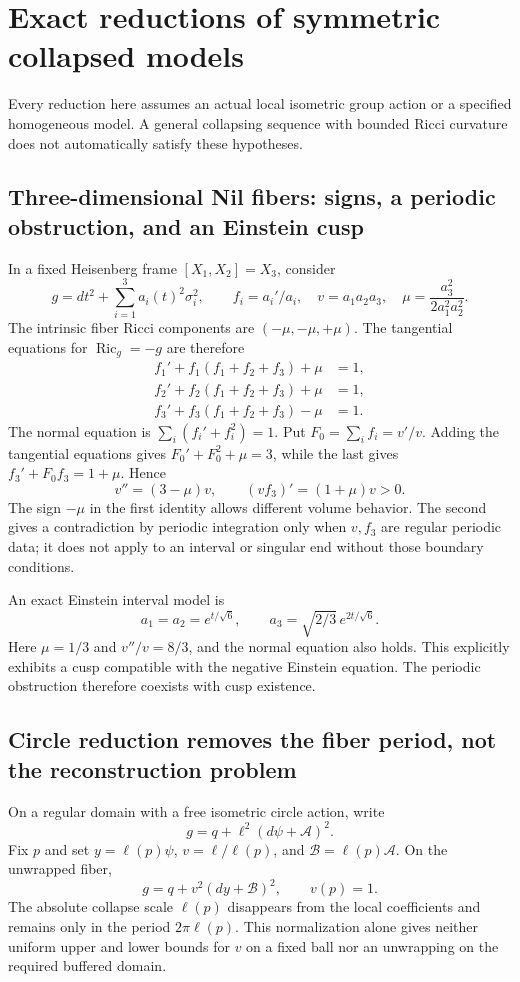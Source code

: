 \documentclass[a4paper,11pt]{article}
\numberwithin{equation}{section}
\theoremstyle{definition}
\newcommand{\Ric}{\operatorname{Ric}}
\begin{document}
\section{Exact reductions of symmetric collapsed models}\label{app:reduction}
Every reduction here assumes an actual local isometric group action or a specified homogeneous model. A general collapsing sequence with bounded Ricci curvature does not automatically satisfy these hypotheses.

\subsection{Three-dimensional Nil fibers: signs, a periodic obstruction, and an Einstein cusp}
In a fixed Heisenberg frame $[X_1,X_2]=X_3$, consider
\[
g=dt^2+\sum_{i=1}^3 a_i(t)^2\sigma_i^2,\qquad
f_i=a_i'/a_i,\quad v=a_1a_2a_3,\quad
\mu=\frac{a_3^2}{2a_1^2a_2^2}.
\]
The intrinsic fiber Ricci components are $(-\mu,-\mu,+\mu)$. The tangential equations for $\Ric_g=-g$ are therefore
\begin{align*}
f_1'+f_1(f_1+f_2+f_3)+\mu&=1,\\
f_2'+f_2(f_1+f_2+f_3)+\mu&=1,\\
f_3'+f_3(f_1+f_2+f_3)-\mu&=1.
\end{align*}
The normal equation is $\sum_i(f_i'+f_i^2)=1$. Put $F_0=\sum_i f_i=v'/v$. Adding the tangential equations gives $F_0'+F_0^2+\mu=3$, while the last gives $f_3'+F_0f_3=1+\mu$. Hence
\[
\boxed{v''=(3-\mu)v,}\qquad
\boxed{(vf_3)'=(1+\mu)v>0.}
\]
The sign $-\mu$ in the first identity allows different volume behavior. The second gives a contradiction by periodic integration only when $v,f_3$ are regular periodic data; it does not apply to an interval or singular end without those boundary conditions.

An exact Einstein interval model is
\[
a_1=a_2=e^{t/\sqrt6},\qquad
a_3=\sqrt{2/3}\,e^{2t/\sqrt6}.
\]
Here $\mu=1/3$ and $v''/v=8/3$, and the normal equation also holds. This explicitly exhibits a cusp compatible with the negative Einstein equation. The periodic obstruction therefore coexists with cusp existence.

\subsection{Circle reduction removes the fiber period, not the reconstruction problem}
On a regular domain with a free isometric circle action, write
\[
g=q+\ell^2(d\psi+\mathcal A)^2.
\]
Fix $p$ and set $y=\ell(p)\psi$, $v=\ell/\ell(p)$, and $\mathcal B=\ell(p)\mathcal A$. On the unwrapped fiber,
\[
g=q+v^2(dy+\mathcal B)^2,\qquad v(p)=1.
\]
The absolute collapse scale $\ell(p)$ disappears from the local coefficients and remains only in the period $2\pi\ell(p)$. This normalization alone gives neither uniform upper and lower bounds for $v$ on a fixed ball nor an unwrapping on the required buffered domain.
\end{document}
